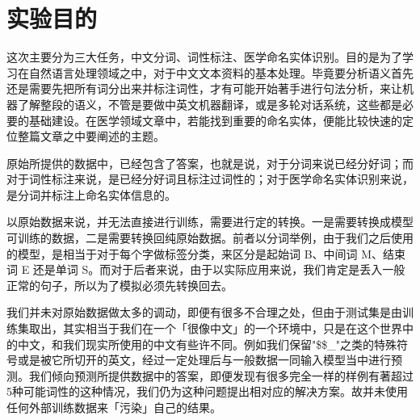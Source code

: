 \section{实验目的}
\label{sec:purpose}

这次主要分为三大任务，中文分词、词性标注、医学命名实体识别。目的是为了学习在自然语言处理领域之中，对于中文文本资料的基本处理。毕竟要分析语义首先还是需要先把所有词分出来并标注词性，才有可能开始著手进行句法分析，来让机器了解整段的语义，不管是要做中英文机器翻译，或是多轮对话系统，这些都是必要的基础建设。在医学领域文章中，若能找到重要的命名实体，便能比较快速的定位整篇文章之中要阐述的主题。

原始所提供的数据中，已经包含了答案，也就是说，对于分词来说已经分好词；而对于词性标注来说，是已经分好词且标注过词性的；对于医学命名实体识别来说，是分词并标注上命名实体信息的。

以原始数据来说，并无法直接进行训练，需要进行定的转换。一是需要转换成模型可训练的数据，二是需要转换回纯原始数据。前者以分词举例，由于我们之后使用的模型，是相当于对于每个字做标签分类，来区分是起始词 B、中间词 M、结束词 E 还是单词 S。而对于后者来说，由于以实际应用来说，我们肯定是丢入一般正常的句子，所以为了模拟必须先转换回去。

我们并未对原始数据做太多的调动，即便有很多不合理之处，但由于测试集是由训练集取出，其实相当于我们在一个「很像中文」的一个环境中，只是在这个世界中的中文，和我们现实所使用的中文有些许不同。例如我们保留"\$\$\_"之类的特殊符号或是被它所切开的英文，经过一定处理后与一般数据一同输入模型当中进行预测。我们倾向预测所提供数据中的答案，即便发现有很多完全一样的样例有著超过5种可能词性的这种情况，我们仍为这种问题提出相对应的解决方案。故并未使用任何外部训练数据来「污染」自己的结果。
